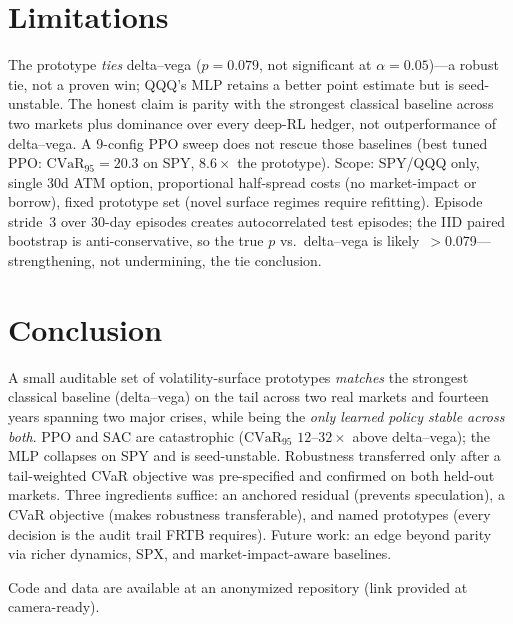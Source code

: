 \documentclass[sigconf,anonymous]{acmart}
\begin{document}
\section{Limitations}
\label{sec:limitations}

The prototype \emph{ties} delta--vega ($p=0.079$, not significant at $\alpha=0.05$)---a
robust tie, not a proven win; QQQ's MLP retains a better point estimate but is
seed-unstable. The honest claim is parity with the strongest classical baseline
across two markets plus dominance over every deep-RL hedger, not outperformance of
delta--vega. A 9-config PPO sweep does not rescue those baselines (best tuned PPO:
$\mathrm{CVaR}_{95}=20.3$ on SPY, $8.6\times$ the prototype).
Scope: SPY/QQQ only, single 30d ATM option, proportional half-spread costs (no
market-impact or borrow), fixed prototype set (novel surface regimes require refitting).
Episode stride~3 over 30-day episodes creates autocorrelated test episodes; the
IID paired bootstrap is anti-conservative, so the true $p$ vs.\ delta--vega is
likely~$>$0.079---strengthening, not undermining, the tie conclusion.

\section{Conclusion}
\label{sec:conclusion}

A small auditable set of volatility-surface prototypes \emph{matches} the strongest
classical baseline (delta--vega) on the tail across two real markets and fourteen
years spanning two major crises, while being the \emph{only learned policy stable
across both}. PPO and SAC are catastrophic ($\mathrm{CVaR}_{95}$ $12$--$32\times$
above delta--vega); the MLP collapses on SPY and is seed-unstable. Robustness
transferred only after a tail-weighted CVaR objective was pre-specified and confirmed
on both held-out markets. Three ingredients suffice: an anchored residual (prevents
speculation), a CVaR objective (makes robustness transferable), and named prototypes
(every decision is the audit trail FRTB requires). Future work: an edge beyond parity
via richer dynamics, SPX, and market-impact-aware baselines.

\begin{acks}
Code and data are available at an anonymized repository (link provided at
camera-ready).
\end{acks}

{\footnotesize\setlength{\bibsep}{0pt}%
%
}
\end{document}
